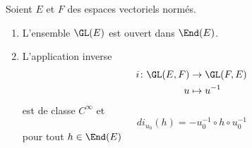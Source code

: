 \begin{theorem}    \label{ThoCINVBTJ}
    Soient \( E\) et \( F\) des espaces vectoriels normés.
    \begin{enumerate}
        \item
        L'ensemble \( \GL(E)\) est ouvert dans \( \End(E)\).
    \item
        L'application inverse
    \begin{equation}
        \begin{aligned}
        i\colon \GL(E,F)&\to \GL(F,E) \\
        u&\mapsto u^{-1} 
        \end{aligned}
    \end{equation}
    est de classe \( C^{\infty}\) et
    \begin{equation}
        di_{u_0}(h)=-u_0^{-1}\circ h\circ u_0^{-1}
    \end{equation}
    pour tout \( h\in\End(E)\)
    \end{enumerate}
\end{theorem}

